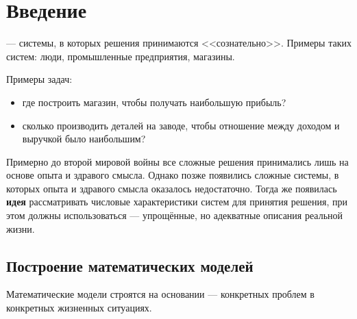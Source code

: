 \chapter{Введение}


 --- системы, в которых решения принимаются <<сознательно>>. Примеры таких систем: люди, промышленные предприятия, магазины.

Примеры задач:
\begin{itemize}[nosep]
	\item где построить магазин, чтобы получать наибольшую прибыль?
	
	\item сколько производить деталей на заводе, чтобы отношение между доходом и выручкой было наибольшим?
\end{itemize}

\bigskip

\begin{note}
Примерно до второй мировой войны все сложные решения принимались лишь на основе опыта и здравого смысла. Однако позже появились сложные системы, в которых опыта и здравого смысла оказалось недостаточно. Тогда же появилась \textbf{идея} рассматривать числовые характеристики систем для принятия решения, при этом должны использоваться  --- упрощённые, но адекватные описания реальной жизни.
\end{note}

\section{Построение математических моделей}

\begin{note}
	 Математические модели строятся на основании  --- конкретных проблем в конкретных жизненных ситуациях.
\end{note}


